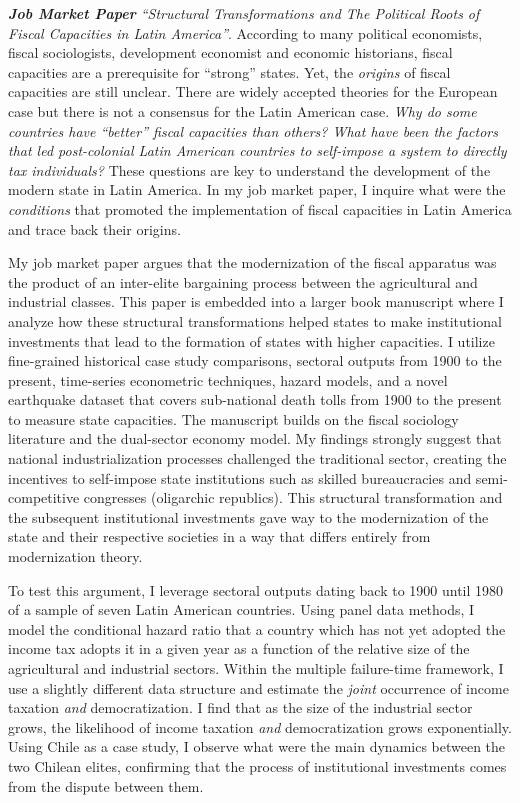 \documentclass[11pt]{letter} %
\begin{document}
\begin{letter}{}
\emph{{\bf Job Market Paper} ``Structural Transformations and The Political Roots of Fiscal Capacities in Latin America''}. According  to many political economists, fiscal sociologists, development economist and economic historians, fiscal capacities are a prerequisite for ``strong'' states. Yet, the \emph{origins} of fiscal capacities are still unclear. There are widely accepted theories for the European case but there is not a consensus for the Latin American case. \emph{Why do some countries have ``better'' fiscal capacities than others? What have been the factors that led post-colonial Latin American countries to self-impose a system to directly tax individuals?} These questions are key to understand the development of the modern state in Latin America. In my job market paper, I inquire what were the \emph{conditions} that promoted the implementation of fiscal capacities in Latin America and trace back their origins.


My job market paper argues that the modernization of the fiscal apparatus was the product of an inter-elite bargaining process between the agricultural and industrial classes. This paper is embedded into a larger book manuscript where I analyze how these structural transformations helped states to make institutional investments that lead to the formation of states with higher capacities. I utilize fine-grained historical case study comparisons, sectoral outputs from 1900 to the present, time-series econometric techniques, hazard models, and a novel earthquake dataset that covers sub-national death tolls from 1900 to the present to measure state capacities. The manuscript builds on the fiscal sociology literature and the dual-sector economy model. My findings strongly suggest that national industrialization processes challenged the traditional sector, creating the incentives to self-impose state institutions such as skilled bureaucracies and semi-competitive congresses (oligarchic republics). This structural transformation and the subsequent institutional investments gave way to the modernization of the state and their respective societies in a way that differs entirely from modernization theory.


To test this argument, I leverage sectoral outputs dating back to 1900 until 1980 of a sample of seven Latin American countries. Using panel data methods, I model the conditional hazard ratio that a country which has not yet adopted the income tax adopts it in a given year as a function of the relative size of the agricultural and industrial sectors. Within the multiple failure-time framework, I use a slightly different data structure and estimate the \emph{joint} occurrence of income taxation \emph{and} democratization. I find that as the size of the industrial sector grows, the likelihood of income taxation \emph{and} democratization grows exponentially. Using Chile as a case study, I observe what were the main dynamics between the two Chilean elites, confirming that the process of institutional investments comes from the dispute between them. 


\end{letter}
\end{document}
